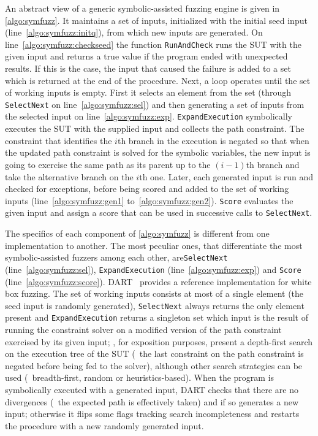 An abstract view of a generic symbolic-assisted fuzzing engine is given in
\autoref{algo:symfuzz}. It maintains a set of inputs, initialized with the
initial seed input (line~\ref{algo:symfuzz:initq}), from which new inputs are
generated. On line~\ref{algo:symfuzz:checkseed} the function
\texttt{RunAndCheck} runs the \ac{SUT} with the given input and returns a true
value if the program ended with unexpected results. If this is the case, the
input that caused the failure is added to a set which is returned at the end of
the procedure. Next, a loop operates until the set of working inputs is empty.
First it selects an element from the set (through \texttt{SelectNext} on
line~\ref{algo:symfuzz:sel}) and then generating a set of inputs from the
selected input on line~\ref{algo:symfuzz:exp}. \texttt{ExpandExecution}
symbolically executes the \ac{SUT} with the supplied input and collects the path
constraint. The constraint that identifies the $i$th branch in the execution is
negated so that when the updated path constraint is solved for the symbolic
variables, the new input is going to exercise the same path as its parent up to
the $(i-1)$th branch and take the alternative branch on the $i$th one. Later,
each generated input is run and checked for exceptions, before being scored and
added to the set of working inputs (line~\ref{algo:symfuzz:gen1}
to~\ref{algo:symfuzz:gen2}). \texttt{Score} evaluates the given input and assign
a score that can be used in successive calls to \texttt{SelectNext}.

The specifics of each component of \autoref{algo:symfuzz} is different
from one implementation to another. The most peculiar ones, that differentiate
the most symbolic-assisted fuzzers among each other,
are\linebreak\texttt{SelectNext} (line~\ref{algo:symfuzz:sel}),
\texttt{ExpandExecution} (line~\ref{algo:symfuzz:exp}) and \texttt{Score}
(line~\ref{algo:symfuzz:score}). DART~\cite{Godefroid2005DARTDA} provides a
reference implementation for white box fuzzing. The set of working inputs
consists at most of a single element (the seed input is randomly generated),
\texttt{SelectNext} always returns the only element present and
\texttt{ExpandExecution} returns a singleton set which input is the result of
running the constraint solver on a modified version of the path constraint
exercised by its given input; \citeauthor{Godefroid2005DARTDA}, for exposition
purposes, present a depth-first search on the execution tree of the \ac{SUT}
(\ie~the last constraint on the path constraint is negated before being fed to
the solver), although other search strategies can be used (\eg~breadth-first,
random or heuristics-based). When the program is symbolically executed with a
generated input, DART checks that there are no divergences (\ie~the expected
path is effectively taken) and if so generates a new input; otherwise it flips
some flags tracking search incompleteness and restarts the procedure with a new
randomly generated input.


